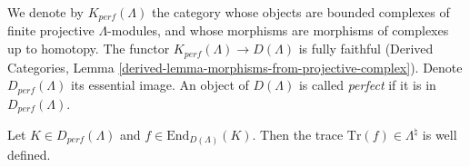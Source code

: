\begin{definition}
\label{definition-perfect}
We denote by $K_{perf}(\Lambda)$ the category whose objects are bounded
complexes of finite projective $\Lambda$-modules, and whose morphisms are
morphisms of complexes up to homotopy. The functor $K_{perf}(\Lambda)\to
D(\Lambda)$ is fully faithful (Derived Categories, Lemma
\ref{derived-lemma-morphisms-from-projective-complex}).
Denote $D_{perf}(\Lambda)$ its essential image.
An object of $D(\Lambda)$ is called {\it perfect} if it is in
$D_{perf}(\Lambda)$.
\end{definition}

\begin{proposition}
\label{proposition-trace-well-defined}
Let $K\in D_{perf}(\Lambda)$ and $f\in \text{End}_{D(\Lambda)}(K)$. Then the
trace $\text{Tr}(f)\in \Lambda^\natural$ is well defined.
\end{proposition}

